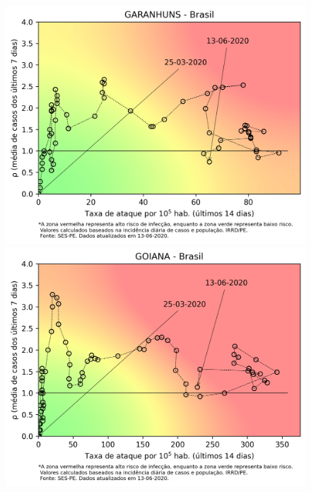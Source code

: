 \documentclass[]{article}
\begin{document}
\begin{figure}[!h]
\begin{minipage}[t]{4cm}
	\centering
	\includegraphics[scale=0.5]{../GARANHUNS.png}
\end{minipage}
\hspace{5cm}
\begin{minipage}[t]{4cm}
	\centering
	\includegraphics[scale=0.5]{../GOIANA.png}
	\vspace{0.2cm}
\end{minipage}


\end{figure}
\end{document}

